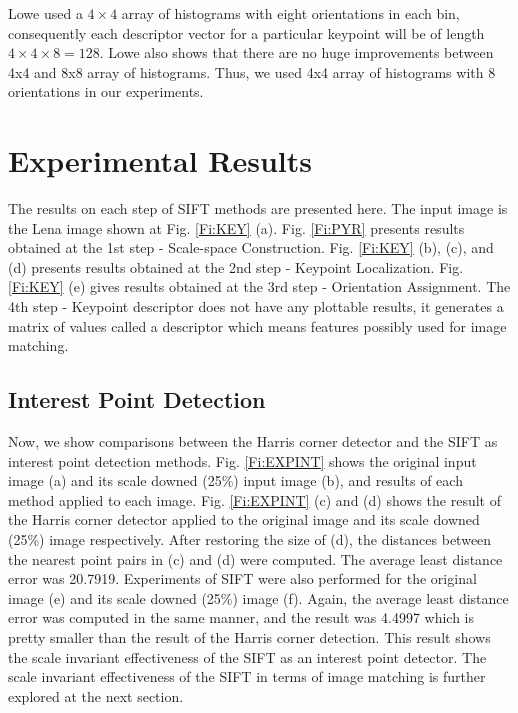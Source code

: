 \documentclass{article}
\begin{document}
Lowe \cite{dLowe04} used a $4\times 4$ array of histograms with eight orientations in each bin, consequently each descriptor vector for a particular keypoint will be of length $4\times 4 \times 8 = 128$. 
Lowe also shows that there are no huge improvements between 4x4 and 8x8 array of histograms. 
Thus, we used 4x4 array of histograms with 8 orientations in our experiments. 

\section{Experimental Results}

The results on each step of SIFT methods are presented here. 
The input image is the Lena image shown at Fig. \ref{Fi:KEY} (a). 
Fig. \ref{Fi:PYR} presents results obtained at the 1st step - Scale-space Construction. 
Fig. \ref{Fi:KEY} (b), (c), and (d) presents results obtained at the 2nd step - Keypoint Localization. 
Fig. \ref{Fi:KEY} (e) gives results obtained at the 3rd step - Orientation Assignment. 
The 4th step - Keypoint descriptor does not have any plottable results, 
it generates a matrix of values called a descriptor which means features possibly used for image matching. 


\subsection{Interest Point Detection}

Now, we show comparisons between the Harris corner detector and the SIFT as interest point detection methods. 
Fig. \ref{Fi:EXPINT} shows the original input image (a) and its scale downed (25\%) input image (b),
 and results of each method applied to each image. 
Fig. \ref{Fi:EXPINT} (c) and (d) shows the result of the Harris corner detector applied 
to the original image and its scale downed (25\%) image respectively. 
After restoring the size of (d), the distances between the nearest point pairs in (c) and (d) were computed. 
The average least distance error was 20.7919. 
Experiments of SIFT were also performed for the original image (e) and its scale downed (25\%) image (f). 
Again, the average least distance error was computed in the same manner, 
and the result was 4.4997 which is pretty smaller than the result of the Harris corner detection. 
This result shows the scale invariant effectiveness of the SIFT as an interest point detector. 
The scale invariant effectiveness of the SIFT in terms of image matching is further explored at the next section. 
\end{document}
